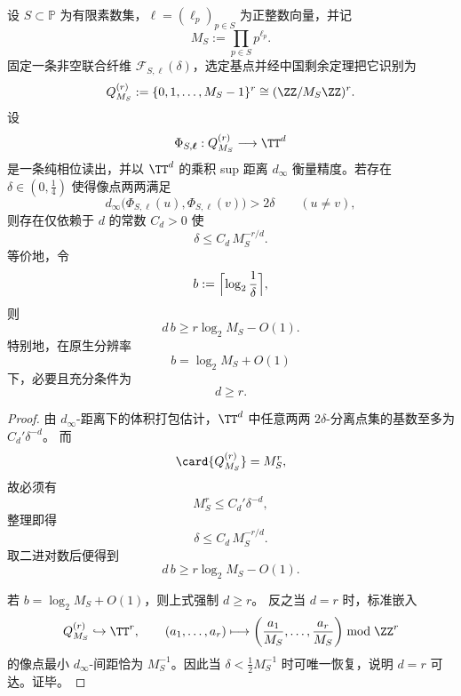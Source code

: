 \begin{theorem}[有限素数联合读出的纯相位打包律]\label{thm:conclusion-boundary-finite-prime-pure-phase-packing}
设 \(S\subset \mathbb P\) 为有限素数集，\(\boldsymbol\ell=(\ell_p)_{p\in S}\) 为正整数向量，并记
\[
M_S:=\prod_{p\in S}p^{\ell_p}.
\]
固定一条非空联合纤维 \(\mathcal F_{S,\boldsymbol\ell}(\delta)\)，选定基点并经中国剩余定理把它识别为
\[
Q_{M_S}^{(r)}:=\{0,1,\dots,M_S-1\}^r\cong (\ZZ/M_S\ZZ)^r.
\]
设
\[
\Phi_{S,\boldsymbol\ell}:Q_{M_S}^{(r)}\longrightarrow \TT^d
\]
是一条纯相位读出，并以 \(\TT^d\) 的乘积 sup 距离 \(d_\infty\) 衡量精度。若存在 \(\delta\in(0,\tfrac14)\) 使得像点两两满足
\[
d_\infty\bigl(\Phi_{S,\boldsymbol\ell}(u),\Phi_{S,\boldsymbol\ell}(v)\bigr)>2\delta
\qquad(u\neq v),
\]
则存在仅依赖于 \(d\) 的常数 \(C_d>0\) 使
\[
\delta\le C_d\,M_S^{-r/d}.
\]
等价地，令
\[
b:=\Bigl\lceil \log_2\frac{1}{\delta}\Bigr\rceil,
\]
则
\[
\boxed{\;
d\,b\ge r\log_2 M_S-O(1).
\;}
\]
特别地，在原生分辨率
\[
b=\log_2 M_S+O(1)
\]
下，必要且充分条件为
\[
d\ge r.
\]
\end{theorem}
\begin{proof}
由 \(d_\infty\)-距离下的体积打包估计，\(\TT^d\) 中任意两两 \(2\delta\)-分离点集的基数至多为 \(C_d'\delta^{-d}\)。
而
\[
\card{Q_{M_S}^{(r)}}=M_S^r,
\]
故必须有
\[
M_S^r\le C_d'\delta^{-d},
\]
整理即得
\[
\delta\le C_d\,M_S^{-r/d}.
\]
取二进对数后便得到
\[
d\,b\ge r\log_2 M_S-O(1).
\]

若 \(b=\log_2 M_S+O(1)\)，则上式强制 \(d\ge r\)。
反之当 \(d=r\) 时，标准嵌入
\[
Q_{M_S}^{(r)}\hookrightarrow \TT^r,
\qquad
(a_1,\dots,a_r)\longmapsto
\left(\frac{a_1}{M_S},\dots,\frac{a_r}{M_S}\right)\bmod \ZZ^r
\]
的像点最小 \(d_\infty\)-间距恰为 \(M_S^{-1}\)。因此当 \(\delta<\tfrac12 M_S^{-1}\) 时可唯一恢复，说明 \(d=r\) 可达。证毕。
\end{proof}


